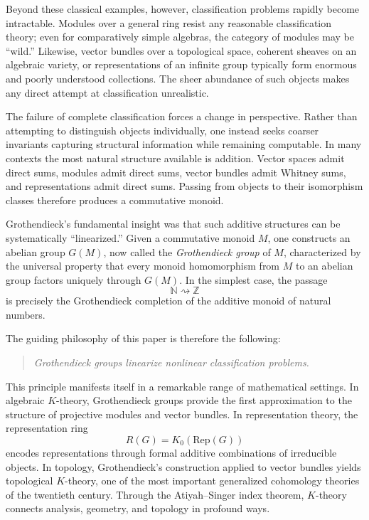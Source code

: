 \documentclass[12pt,reqno]{amsart}
\theoremstyle{plain}
\numberwithin{equation}{section}
\begin{document}
Beyond these classical examples, however, classification problems rapidly become intractable. Modules over a general ring resist any reasonable classification theory; even for comparatively simple algebras, the category of modules may be ``wild.'' Likewise, vector bundles over a topological space, coherent sheaves on an algebraic variety, or representations of an infinite group typically form enormous and poorly understood collections. The sheer abundance of such objects makes any direct attempt at classification unrealistic.

The failure of complete classification forces a change in perspective. Rather than attempting to distinguish objects individually, one instead seeks coarser invariants capturing structural information while remaining computable. In many contexts the most natural structure available is addition. Vector spaces admit direct sums, modules admit direct sums, vector bundles admit Whitney sums, and representations admit direct sums. Passing from objects to their isomorphism classes therefore produces a commutative monoid.

Grothendieck's fundamental insight was that such additive structures can be systematically ``linearized.'' Given a commutative monoid $M$, one constructs an abelian group $G(M)$, now called the \emph{Grothendieck group} of $M$, characterized by the universal property that every monoid homomorphism from $M$ to an abelian group factors uniquely through $G(M)$. In the simplest case, the passage
\[
\mathbb N \rightsquigarrow \mathbb Z
\]
is precisely the Grothendieck completion of the additive monoid of natural numbers.

The guiding philosophy of this paper is therefore the following:
\begin{quote}
\textit{Grothendieck groups linearize nonlinear classification problems.}
\end{quote}

\medskip
This principle manifests itself in a remarkable range of mathematical settings. In algebraic $K$-theory, Grothendieck groups provide the first approximation to the structure of projective modules and vector bundles. In representation theory, the representation ring
\[
R(G)=K_0(\mathrm{Rep}(G))
\]
encodes representations through formal additive combinations of irreducible objects. In topology, Grothendieck's construction applied to vector bundles yields topological $K$-theory, one of the most important generalized cohomology theories of the twentieth century. Through the Atiyah--Singer index theorem, $K$-theory connects analysis, geometry, and topology in profound ways.
\end{document}
